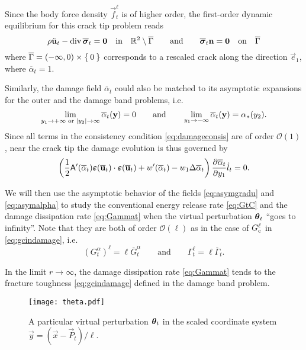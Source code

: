 Since the body force density $\vec{f}_t^\ell$ is of higher order, the first-order dynamic equilibrium for this crack tip problem reads
\begin{equation} \label{eq:waveequationattip}
\rho\ddot{\vec{u}}_t-\div\overline{\sig}_t=\vec{0}\quad\text{in}\quad\mathbb{R}^2\setminus\overline{\Gamma}\qquad\text{and}\qquad\overline{\sig}_t\vec{n}=\vec{0}\quad\text{on}\quad\overline{\Gamma}
\end{equation}
where $\overline{\Gamma}=(-\infty,0)\times\Set{0}$ corresponds to a rescaled crack along the direction $\vec{e}_1$, where $\overline{\alpha}_t=1$.

Similarly, the damage field $\overline{\alpha}_t$ could also be matched to its asymptotic expansions for the outer and the damage band problems, i.e.
\begin{equation} \label{eq:asymalpha}
\lim_{y_1\to+\infty\text{ or }\abs{y_2}\to\infty}\overline{\alpha}_t(\vec{y})=0\qquad\text{and}\qquad\lim_{y_1\to-\infty}\overline{\alpha}_t(\vec{y})=\alpha_*(y_2).
\end{equation}
Since all terms in the consistency condition \eqref{eq:damageconsis} are of order $\mathcal{O}(1)$, near the crack tip the damage evolution is thus governed by
\begin{equation} \label{eq:damageconditiontip}
\left(\frac{1}{2}\tens{A}'(\overline{\alpha}_t)\eps(\overline{\vec{u}}_t)\cdot\eps(\overline{\vec{u}}_t)+w'(\overline{\alpha}_t)-w_1\Delta\overline{\alpha}_t\right)\frac{\partial\overline{\alpha}_t}{\partial y_1}\dot{l}_t=0.
\end{equation}

We will then use the asymptotic behavior of the fields \eqref{eq:asymgradu} and \eqref{eq:asymalpha} to study the conventional energy release rate \eqref{eq:GtC} and the damage dissipation rate \eqref{eq:Gammat} when the virtual perturbation $\vtheta_t$ ``goes to infinity''. Note that they are both of order $\mathcal{O}(\ell)$ as in the case of $G_\mathrm{c}^\ell$ in \eqref{eq:gcindamage}, i.e.
\begin{equation} \label{eq:Gtalphaell}
(G^\alpha_t)^\ell=\ell\overline{G}^\alpha_t\qquad\text{and}\qquad\Gamma_t^\ell=\ell\overline{\Gamma}_t.
\end{equation}

\begin{proposition} \label{prop:Gammattogc}
In the limit $r\to\infty$, the damage dissipation rate \eqref{eq:Gammat} tends to the fracture toughness \eqref{eq:gcindamage} defined in the damage band problem.
\end{proposition}
\begin{figure}[htbp]
\centering
\texttt{[image: theta.pdf]}
\caption{A particular virtual perturbation $\vtheta_t$ in the scaled coordinate system $\vec{y}=(\vec{x}-\vec{P}_t)/\ell$.} \label{fig:theta}
\end{figure}

